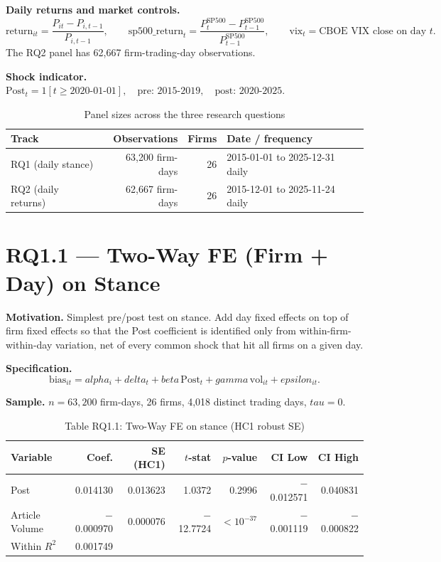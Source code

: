 \documentclass[11pt]{article}
\def\beta{beta}%
\def\alpha{alpha}%
\def\delta{delta}%
\def\gamma{gamma}%
\def\tau{tau}%
\def\varepsilon{epsilon}%
\def\mathbb#1{#1}%
\begin{document}
\textbf{Daily returns and market controls.}
\[
\text{return}_{it}=\frac{P_{it}-P_{i,t-1}}{P_{i,t-1}},\qquad
\text{sp500\_return}_t = \frac{P^{\text{SP500}}_t - P^{\text{SP500}}_{t-1}}{P^{\text{SP500}}_{t-1}},\qquad
\text{vix}_t = \text{CBOE VIX close on day } t.
\]
The RQ2 panel has 62{,}667 firm-trading-day observations.

\textbf{Shock indicator.}
$
\text{Post}_t = \mathbb{1}[t \ge 2020\text{-}01\text{-}01],\quad
\text{pre: } 2015\text{-}2019,\quad
\text{post: } 2020\text{-}2025.
$

\begin{table}[H]
\centering
\caption*{Panel sizes across the three research questions}
\begin{tabular}{lrrl}
\toprule
Track & Observations & Firms & Date / frequency \\
\midrule
RQ1 (daily stance) & 63{,}200 firm-days & 26 & 2015-01-01 to 2025-12-31 daily \\
RQ2 (daily returns) & 62{,}667 firm-days & 26 & 2015-12-01 to 2025-11-24 daily \\
\bottomrule
\end{tabular}
\end{table}

\section*{RQ1.1 --- Two-Way FE (Firm + Day) on Stance}\label{sec:rq1.1}
\textbf{Motivation.} Simplest pre/post test on stance. Add day fixed effects on top of firm fixed effects so that the Post coefficient is identified only from within-firm-within-day variation, net of every common shock that hit all firms on a given day.

\textbf{Specification.}
\[
\text{bias}_{it} = \alpha_i + \delta_t + \beta\,\text{Post}_t + \gamma\,\text{vol}_{it} + \varepsilon_{it}.
\]

\textbf{Sample.} $n = 63{,}200$ firm-days, 26 firms, 4{,}018 distinct trading days, $\tau = 0$.

\begin{table}[H]
\centering
\caption*{Table RQ1.1: Two-Way FE on stance (HC1 robust SE)}
\begin{tabular}{lrrrrrr}
\toprule
Variable & Coef. & SE (HC1) & $t$-stat & $p$-value & CI Low & CI High \\
\midrule
Post & 0.014130 & 0.013623 & 1.0372 & 0.2996 & $-$0.012571 & 0.040831 \\
Article Volume & $-$0.000970 & 0.000076 & $-$12.7724 & $<10^{-37}$ & $-$0.001119 & $-$0.000822 \\
\midrule
Within $R^2$ & 0.001749 & \multicolumn{5}{r}{} \\
\bottomrule
\end{tabular}
\end{table}
\end{document}
